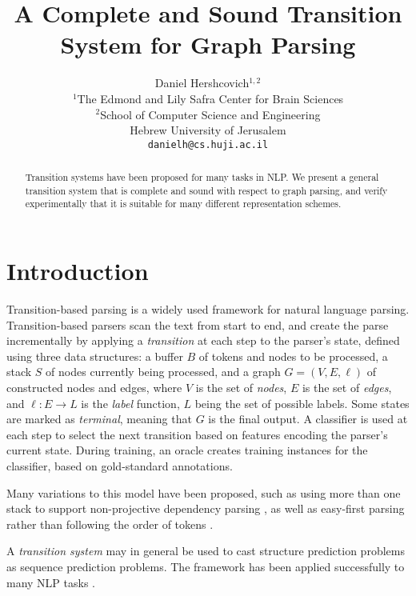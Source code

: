 \documentclass[11pt,a4paper]{article}
\title{A Complete and Sound Transition System for Graph Parsing}
\author{Daniel Hershcovich$^{1,2}$ \\
  $^1$The Edmond and Lily Safra Center for Brain Sciences \\
  $^2$School of Computer Science and Engineering \\
  Hebrew University of Jerusalem \\
  \texttt{danielh@cs.huji.ac.il}
}
\date{}
\begin{document}
\maketitle

\begin{abstract}
Transition systems have been proposed for many tasks in NLP.
We present a general transition system that is complete and sound with respect to graph parsing,
and verify experimentally that it is suitable for many different representation schemes.
\end{abstract}


\section{Introduction}\label{sec:introduction}

Transition-based parsing is a widely used framework for natural language parsing.
Transition-based parsers scan the text from start to end,
and create the parse incrementally by applying a \textit{transition}
at each step to the parser's state,
defined using three data structures: a buffer $B$ of tokens and nodes to be processed,
a stack $S$ of nodes currently being processed,
and a graph $G=(V,E,\ell)$ of constructed nodes and edges,
where $V$ is the set of \emph{nodes}, $E$ is the set of \emph{edges},
and $\ell : E \to L$ is the \emph{label} function, $L$ being the set of possible labels.
Some states are marked as \textit{terminal}, meaning that $G$ is the final output.
A classifier is used at each step to select the next transition based on features
encoding the parser's current state.
During training, an oracle creates training instances for the classifier,
based on gold-standard annotations.

Many variations to this model have been proposed, such as using more than one stack to support
non-projective dependency parsing \cite{gomez2010a},
as well as easy-first parsing rather than following the order of tokens \cite{goldberg2010efficient}.

A \textit{transition system} \cite{Nivr:06,nivre2008algorithms} may in general be used to cast structure prediction
problems as sequence prediction problems.
The framework has been applied successfully to many NLP tasks
\cite[][among others]{bohnet2012transition,lample-EtAl:2016:N16-1,kiperwasser2016simple,zhang-zhang-fu:2016:P16-1,kong2017dragnn,hershcovich2017a,zhou2017neural}.
\end{document}
